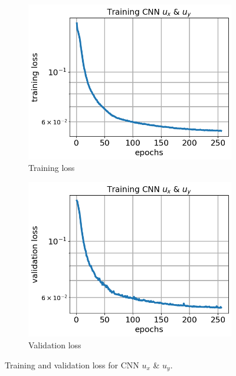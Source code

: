 \documentclass[12pt]{article}
\newcommand{\nhgfigheight}{4.0cm}
\begin{document}
\begin{figure}
  \centering
  \begin{subfigure}[b]{0.45\linewidth}
    \includegraphics[totalheight=\nhgfigheight]{Figures/final/training/uxuy/field_images_plot_loss.png}
    \caption{Training loss}
  \end{subfigure}
  \begin{subfigure}[b]{0.45\linewidth}
    \includegraphics[totalheight=\nhgfigheight]{Figures/final/training/uxuy/field_images_plot_val_loss.png}
    \caption{Validation loss}
  \end{subfigure}
  \caption{\label{fig:oneinc:trainuxuy} Training and validation loss for CNN $u_x$ \& $u_y$.}
\end{figure}
\end{document}
